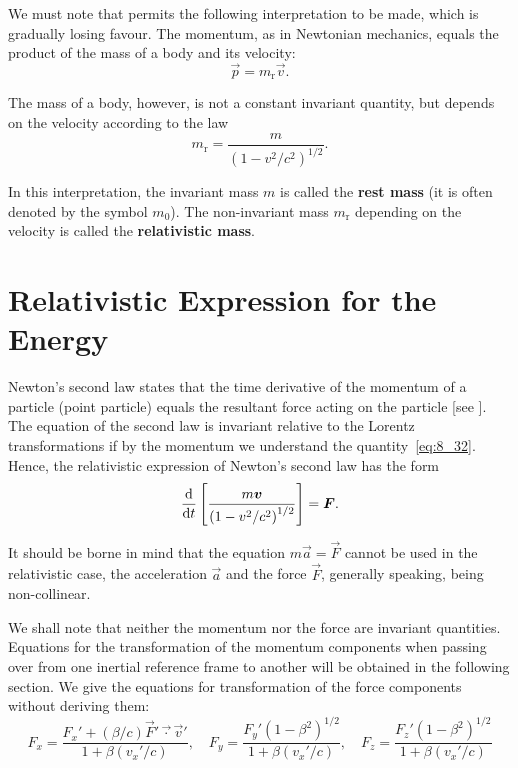 We must note that  permits the following interpretation to be made, which is gradually losing favour. The momentum, as in Newtonian mechanics, equals the product of the mass of a body and its velocity:
\begin{equation}\label{eq:8_33}
	\vec{p} = m_{\text{r}}\vec{v}.
\end{equation}

\noindent
The mass of a body, however, is not a constant invariant quantity, but depends on the velocity according to the law
\begin{equation}\label{eq:8_34}
	m_{\text{r}} = \frac{m}{\left(1-v^2/c^2\right)^{1/2}}.
\end{equation}

\noindent
In this interpretation, the invariant mass $m$ is called the \textbf{rest mass} (it is often denoted by the symbol $m_0$). The non-invariant mass $m_{\text{r}}$ depending on the velocity is called the \textbf{relativistic mass}.

\section{Relativistic Expression for the Energy}\label{sec:8_7}

Newton's second law states that the time derivative of the momentum of a particle (point particle) equals the resultant force acting on the particle [see ]. The equation of the second law is invariant relative to the Lorentz transformations if by the momentum we understand the quantity~\eqref{eq:8_32}. Hence, the relativistic expression of Newton's second law has the form
\begin{equation}\label{eq:8_35}
	\frac{\mathrm{d}}{\mathrm{d} t}\left[\frac{m\boldsymbol{v}}{\left(1-v^2/c^2\right)^{1/2}}\right] = \boldsymbol{F}.
\end{equation}

It should be borne in mind that the equation $m\vec{a}=\vec{F}$ cannot be used in the relativistic case, the acceleration $\vec{a}$ and the force $\vec{F}$, generally speaking, being non-collinear.

We shall note that neither the momentum nor the force are invariant quantities. Equations for the transformation of the momentum components when passing over from one inertial reference frame to another will be obtained in the following section. We give the equations for transformation of the force components without deriving them:
\begin{equation}\label{eq:8_36}
	F_x = \frac{F_x' + (\beta/c)\vec{F}'\vec{\cdot}\vec{v}'}{1 + \beta(v_x'/c)},\quad F_y = \frac{F_y'\left(1-\beta^2\right)^{1/2}}{1 + \beta(v_x'/c)},\quad F_z = \frac{F_z'\left(1-\beta^2\right)^{1/2}}{1 + \beta(v_x'/c)}
\end{equation}

